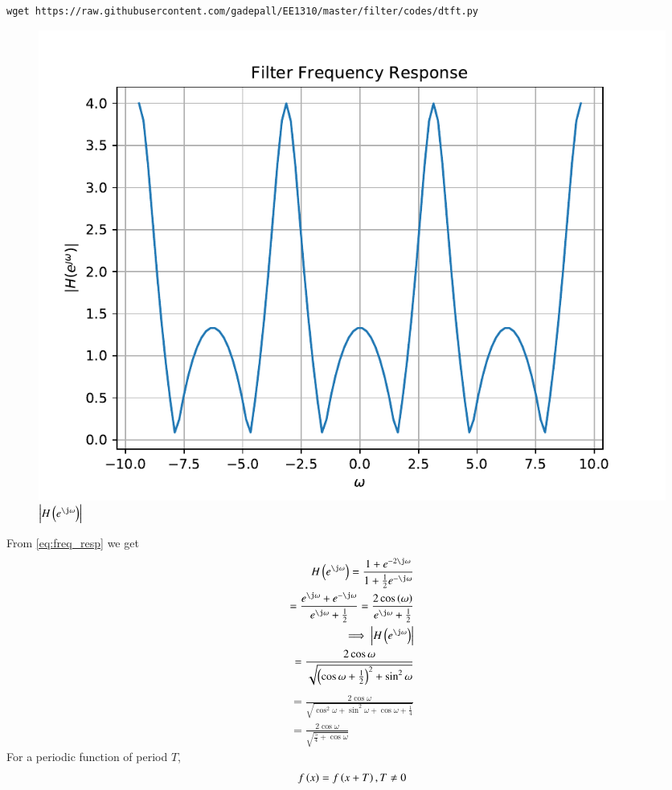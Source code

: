 \documentclass[journal,12pt,twocolumn]{IEEEtran}
\renewcommand\thesection{\arabic{section}}
\begin{document}
\begin{enumerate}[label=\thesection.\arabic*]
		\begin{lstlisting}
wget https://raw.githubusercontent.com/gadepall/EE1310/master/filter/codes/dtft.py
		\end{lstlisting}
		\begin{figure}[!ht]
			\centering
			\includegraphics[width=\columnwidth]{./figs/dtft}
			\caption{$\abs{H\brak{e^{\j\omega}}}$}
\label{fig:dtft}
		\end{figure}
\solution From \eqref{eq:freq_resp} we get
	\begin{align}
		H\brak{e^{\j \omega}}=\frac{1 + e^{-2\j \omega}}{1 + \frac{1}{2}e^{-\j \omega}}\\
		=\frac{e^{\j \omega} + e^{-\j \omega}}{e^{\j \omega} + \frac{1}{2}}
		=\frac{2\cos\brak{\omega}}{e^{\j \omega} + \frac{1}{2}}\\
		\implies \abs{H\brak{e^{\j \omega}}}\\
		=\frac{2\cos\omega}{\sqrt{\brak{\cos\omega+\frac{1}{2}}^{2}+\sin^2\omega}}
	\end{align}
	\begin{align}
		=\frac{2\cos\omega}{\sqrt{\cos^2\omega + \sin^2 \omega + \cos \omega + \frac{1}{4}}}\\
		=\frac{2\cos\omega}{\sqrt{\frac{5}{4}+\cos\omega}}
	\end{align}
	For a periodic function of period $T$,
	\begin{align}
		f\left(x\right) = f\left(x+T\right), T \neq 0	 
	\end{align}


\end{enumerate}
\end{document}
